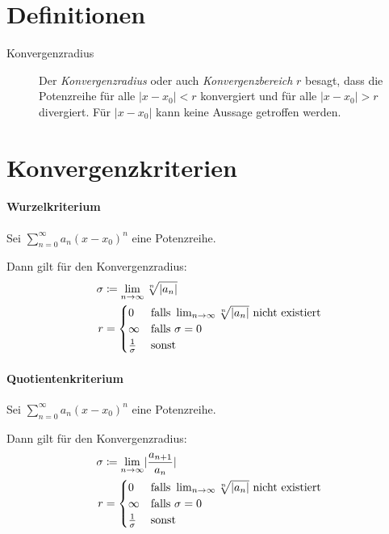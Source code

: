    \section{Definitionen}
        \begin{description}
            \item[Konvergenzradius] Der \textit{Konvergenzradius} oder auch \textit{Konvergenzbereich} $ r $ besagt, dass die Potenzreihe für alle $ \lvert x - x _ 0 \rvert < r $ konvergiert und für alle $ \lvert x - x _ 0 \rvert > r $ divergiert. Für $ \lvert x - x _ 0 \rvert $ kann keine Aussage getroffen werden.
        \end{description}

    \section{Konvergenzkriterien}
        \paragraph{Wurzelkriterium}
            Sei $ \sum _ { n = 0 } ^ \infty a _ n (x - x _ 0) ^ n $ eine Potenzreihe.

            Dann gilt für den Konvergenzradius:
            \begin{align*}
                \sigma &\coloneqq \lim_{n \to \infty} \sqrt[n]{\lvert a _ n \rvert} \\
                r &=
                \begin{cases}
                    0 & \text{falls } \lim_{n \to \infty} \sqrt[n]{\lvert a _ n \rvert} \text{ nicht existiert} \\
                    \infty & \text{falls } \sigma = 0 \\
                    \frac{1}{\sigma} & \text{sonst}
                \end{cases}
            \end{align*}

        \paragraph{Quotientenkriterium}
            Sei $ \sum _ { n = 0 } ^ \infty a _ n (x - x _ 0) ^ n $ eine Potenzreihe.

            Dann gilt für den Konvergenzradius:
            \begin{align*}
                \sigma &\coloneqq \lim_{n \to \infty} \lvert \frac{a _ { n + 1 }}{a _ n} \rvert \\
                r &=
                \begin{cases}
                    0 & \text{falls } \lim_{n \to \infty} \sqrt[n]{\lvert a _ n \rvert} \text{ nicht existiert} \\
                    \infty & \text{falls } \sigma = 0 \\
                    \frac{1}{\sigma} & \text{sonst}
                \end{cases}
            \end{align*}

